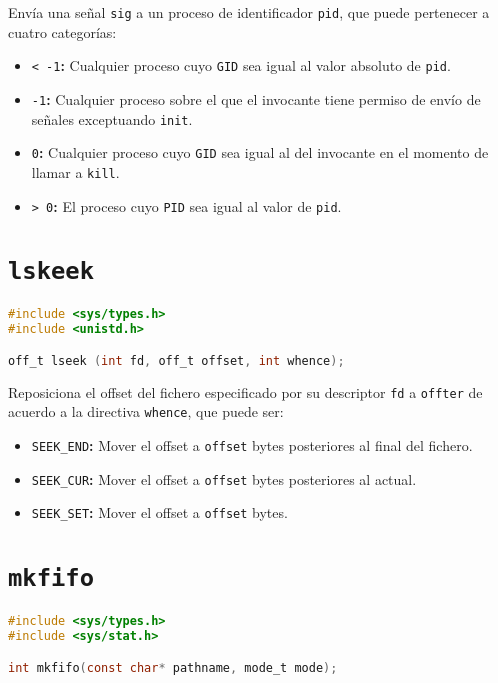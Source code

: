 Envía una señal \texttt{sig} a un proceso de identificador \texttt{pid}, que puede pertenecer a cuatro categorías:

\begin{itemize}
	\item\texttt{< -1}\textbf{:} Cualquier proceso cuyo \texttt{GID} sea igual al valor absoluto de \texttt{pid}.
	\item\texttt{-1}\textbf{:} Cualquier proceso sobre el que el invocante tiene permiso de envío de señales exceptuando \texttt{init}.
	\item\texttt{0}\textbf{:} Cualquier proceso cuyo \texttt{GID} sea igual al del invocante en el momento de llamar a \texttt{kill}.
	\item\texttt{> 0}\textbf{:} El proceso cuyo \texttt{PID} sea igual al valor de \texttt{pid}.
\end{itemize}

\section{\texttt{lskeek}}\label{lseek}

\begin{lstlisting}[language=C]
#include <sys/types.h>
#include <unistd.h>

off_t lseek (int fd, off_t offset, int whence);
\end{lstlisting}

Reposiciona el offset del fichero especificado por su descriptor \texttt{fd} a \texttt{offter} de acuerdo a la directiva \texttt{whence}, que puede ser:

\begin{itemize}
	\item\texttt{SEEK\_END}\textbf{:} Mover el offset a \texttt{offset} bytes posteriores al final del fichero.
	\item\texttt{SEEK\_CUR}\textbf{:} Mover el offset a \texttt{offset} bytes posteriores al actual.
	\item\texttt{SEEK\_SET}\textbf{:} Mover el offset a \texttt{offset} bytes.
\end{itemize}

\section{\texttt{mkfifo}}\label{mkfifo}

\begin{lstlisting}[language=C]
#include <sys/types.h>
#include <sys/stat.h>

int mkfifo(const char* pathname, mode_t mode);
\end{lstlisting}

